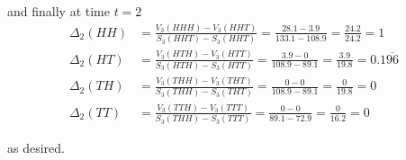 \documentclass[12pt]{article}
\begin{document}
and finally at time $t = 2$
\begin{align*}
	\Delta_2(HH) &= \frac{V_3(HHH) - V_3(HHT)}{S_3(HHT) - S_3(HHT)} = \frac{28.1 - 3.9}{133.1 - 108.9} = \frac{24.2}{24.2} = 1 \\
	\Delta_2(HT) &= \frac{V_3(HTH) - V_3(HTT)}{S_3(HTH) - S_3(HTT)} = \frac{3.9 - 0}{108.9 - 89.1} = \frac{3.9}{19.8} = 0.1\overline{96} \\
	\Delta_2(TH) &= \frac{V_3(THH) - V_3(THT)}{S_3(THH) - S_3(THT)} = \frac{0 - 0}{108.9 - 89.1} = \frac{0}{19.8} = 0 \\
	\Delta_2(TT) &= \frac{V_3(TTH) - V_3(TTT)}{S_3(THH) - S_3(TTT)} = \frac{0 - 0}{89.1 - 72.9} = \frac{0}{16.2} = 0
\end{align*}

as desired.
\end{document}
